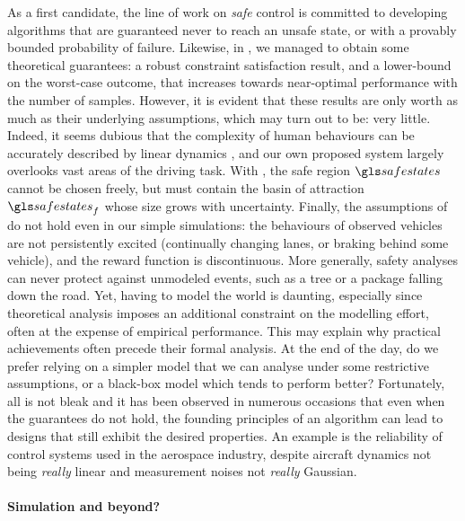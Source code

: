 As a first candidate, the line of work on \emph{safe} control is committed to developing algorithms that are guaranteed never to reach an unsafe state, or with a provably bounded probability of failure. 
Likewise, in , we managed to obtain some theoretical guarantees: a robust constraint satisfaction result, and a lower-bound on the worst-case outcome, that increases towards near-optimal performance with the number of samples. However, it is evident that these results are only worth as much as their underlying assumptions, which may turn out to be: very little. Indeed, it seems dubious that the complexity of human behaviours can be accurately described by linear dynamics , and our own proposed system largely overlooks vast areas of the driving task. With , the safe region $\safestates$ cannot be chosen freely, but must contain the basin of attraction $\safestates_{f}$ whose size grows with uncertainty. Finally, the assumptions of  do not hold even in our simple simulations: the behaviours of observed vehicles are not persistently excited (\ie continually changing lanes, or braking behind some vehicle), and the reward function is discontinuous. More generally, safety analyses can never protect against unmodeled events, such as a tree or a package falling down the road. Yet, having to model the world is daunting, especially since theoretical analysis imposes an additional constraint on the modelling effort, often at the expense of empirical performance. This may explain why practical achievements often precede their formal analysis. At the end of the day, do we prefer relying on a simpler model that we can analyse under some restrictive assumptions, or a black-box model which tends to perform better? Fortunately, all is not bleak and it has been observed in numerous occasions that even when the guarantees do not hold, the founding principles of an algorithm can lead to designs that still exhibit the desired properties. An example is the reliability of control systems used in the aerospace industry, despite aircraft dynamics not being \emph{really} linear and measurement noises not \emph{really} Gaussian.


\paragraph{Simulation and beyond?}

